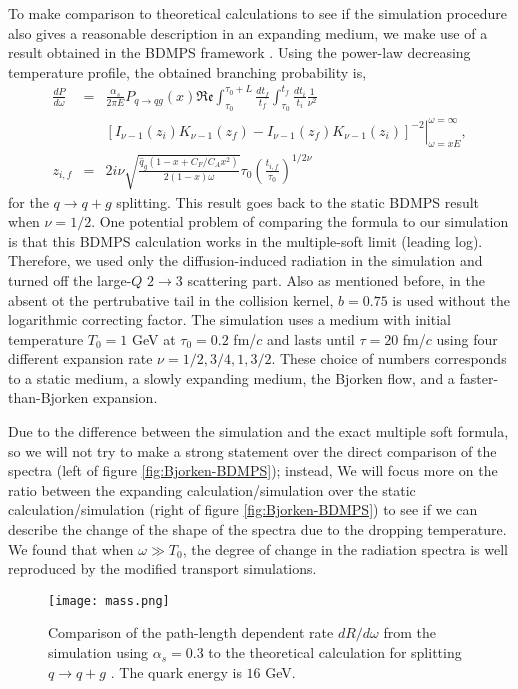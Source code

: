 To make comparison to theoretical calculations to see if the simulation procedure also gives a reasonable description in an expanding medium, we make use of a result obtained in the BDMPS framework \cite{Baier:1998yf}.
Using the power-law decreasing temperature profile, the obtained branching probability is,
\begin{eqnarray}
\frac{dP}{d\omega} &=& \frac{\alpha_s}{2\pi E}P_{q\rightarrow qg}(x)\mathfrak{Re}\int_{\tau_0}^{\tau_0+L}\frac{dt_f}{t_f}\int_{\tau_0}^{t_f}\frac{dt_i}{t_i} \frac{1}{\nu^2}\\
\nonumber
&& \left.\left[ I_{\nu-1}(z_i)K_{\nu-1}(z_f)-I_{\nu-1}(z_f)K_{\nu-1}(z_i)\right]^{-2}\right|_{\omega=xE}^{\omega=\infty},\\
z_{i,f} &=& 2i\nu \sqrt{\frac{\hat{q}_g(1-x+C_F/C_A x^2)}{2(1-x)\omega}} \tau_0 \left( \frac{t_{i,f}}{\tau_0}\right) ^{1/2\nu}
\end{eqnarray}
for the $q\rightarrow q+g$ splitting.
This result goes back to the static BDMPS result \cite{Baier:1996kr} when $\nu=1/2$.
One potential problem of comparing the formula to our simulation is that this BDMPS calculation works in the multiple-soft limit (leading log).
Therefore, we used only the diffusion-induced radiation in the simulation and turned off the large-$Q$ $2\rightarrow 3$ scattering part.
Also as mentioned before, in the absent ot the pertrubative tail in the collision kernel, $b=0.75$ is used without the logarithmic correcting factor.
The simulation uses a medium with initial temperature $T_0=1$ GeV at $\tau_0=0.2$ fm/$c$ and lasts until $\tau = 20$ fm/$c$ using four different expansion rate $\nu = 1/2, 3/4, 1, 3/2$.
These choice of numbers corresponds to a static medium, a slowly expanding medium, the Bjorken flow, and a faster-than-Bjorken expansion.

Due to the difference between the simulation and the exact multiple soft formula, so we will not try to make a strong statement over the direct comparison of the spectra (left of figure \ref{fig:Bjorken-BDMPS}); instead, We will focus more on the ratio between the expanding calculation/simulation over the static calculation/simulation (right of figure \ref{fig:Bjorken-BDMPS}) to see if we can describe the change of the shape of the spectra due to the dropping temperature.
We found that when $\omega \gg T_0$, the degree of change in the radiation spectra is well reproduced by the modified transport simulations.

\begin{figure}
\texttt{[image: mass.png]}
\caption{Comparison of the path-length dependent rate $dR/d\omega$ from the simulation using $\alpha_s = 0.3$ to the theoretical calculation for splitting $q\rightarrow q+g$ \cite{CaronHuot:2010bp}. The quark energy is $16$ GeV.}
\label{fig:spectra-L-alphas=0.3}
\end{figure}

